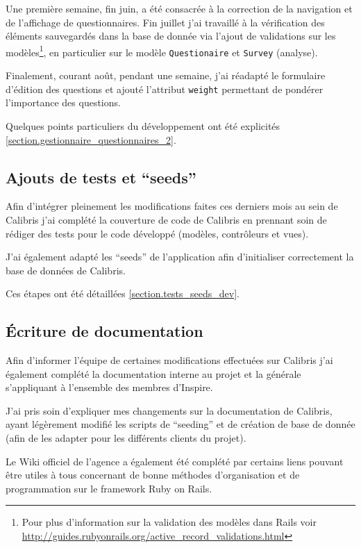 \documentclass[12pt,a4paper]{book}
\begin{document}
Une première semaine, fin juin, a été consacrée à la correction de la navigation et de l'affichage de questionnaires. Fin juillet j'ai travaillé à la vérification des éléments sauvegardés dans la base de donnée via l'ajout de validations sur les modèles\footnote{Pour plus d'information sur la validation des modèles dans Rails voir \url{http://guides.rubyonrails.org/active_record_validations.html}}, en particulier sur le modèle \texttt{Questionaire} et \texttt{Survey} (analyse).

Finalement, courant août, pendant une semaine, j'ai réadapté le formulaire d'édition des questions et ajouté l'attribut \texttt{weight} permettant de pondérer l'importance des questions.

Quelques points particuliers du développement ont été explicités \cref{section.gestionnaire_questionnaires_2}.

\subsection{Ajouts de tests et ``seeds''}

Afin d'intégrer pleinement les modifications faites ces derniers mois au sein de Calibris j'ai complété la couverture de code de Calibris en prennant soin de rédiger des tests pour le code développé (modèles, contrôleurs et vues).

J'ai également adapté les ``seeds'' de l'application afin d'initialiser correctement la base de données de Calibris. 

Ces étapes ont été détaillées \cref{section.tests_seeds_dev}.

\subsection{Écriture de documentation}

Afin d'informer l'équipe de certaines modifications effectuées sur Calibris j'ai également complété la documentation interne au projet et la générale s'appliquant à l'ensemble des membres d'Inspire.

J'ai pris soin d'expliquer mes changements sur la documentation de Calibris, ayant légèrement modifié les scripts de ``seeding'' et de création de base de donnée (afin de les adapter pour les différents clients du projet).

Le Wiki officiel de l'agence a également été complété par certains liens pouvant être utiles à tous concernant de bonne méthodes d'organisation et de programmation sur le framework Ruby on Rails.
\end{document}
